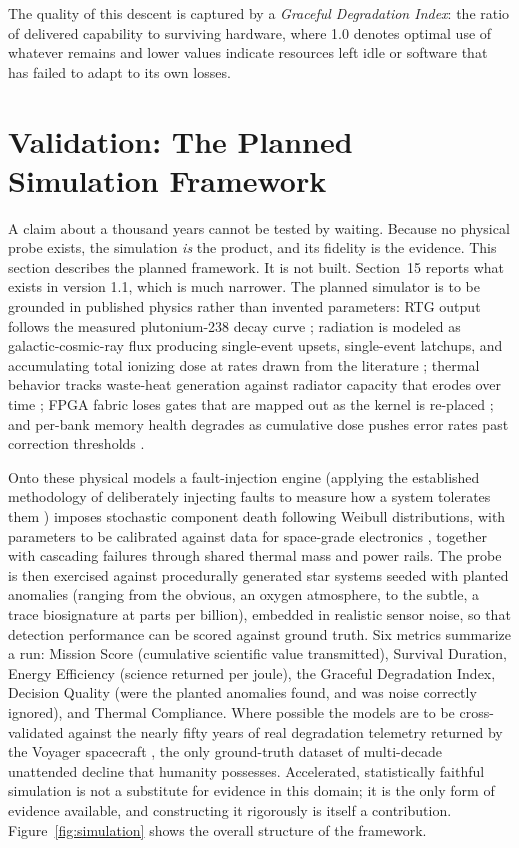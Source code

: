 \documentclass[10pt, a4paper]{article}
\begin{document}
The quality of this descent is captured by a \textit{Graceful Degradation Index}: the ratio of delivered capability to surviving hardware, where 1.0 denotes optimal use of whatever remains and lower values indicate resources left idle or software that has failed to adapt to its own losses.

\section{Validation: The Planned Simulation Framework}

A claim about a thousand years cannot be tested by waiting. Because no physical probe exists, the simulation \textit{is} the product, and its fidelity is the evidence. This section describes the planned framework. It is not built. Section~15 reports what exists in version 1.1, which is much narrower. The planned simulator is to be grounded in published physics rather than invented parameters: RTG output follows the measured plutonium-238 decay curve \cite{bennett2006}; radiation is modeled as galactic-cosmic-ray flux producing single-event upsets, single-event latchups, and accumulating total ionizing dose at rates drawn from the literature \cite{normand1996, baumann2005, schwank2008}; thermal behavior tracks waste-heat generation against radiator capacity that erodes over time \cite{gilmore2002}; FPGA fabric loses gates that are mapped out as the kernel is re-placed \cite{wirthlin2015}; and per-bank memory health degrades as cumulative dose pushes error rates past correction thresholds \cite{gerardin2010}.

Onto these physical models a fault-injection engine (applying the established methodology of deliberately injecting faults to measure how a system tolerates them \cite{hsueh1997}) imposes stochastic component death following Weibull distributions, with parameters to be calibrated against data for space-grade electronics \cite{weibull1951}, together with cascading failures through shared thermal mass and power rails. The probe is then exercised against procedurally generated star systems seeded with planted anomalies (ranging from the obvious, an oxygen atmosphere, to the subtle, a trace biosignature at parts per billion), embedded in realistic sensor noise, so that detection performance can be scored against ground truth. Six metrics summarize a run: Mission Score (cumulative scientific value transmitted), Survival Duration, Energy Efficiency (science returned per joule), the Graceful Degradation Index, Decision Quality (were the planted anomalies found, and was noise correctly ignored), and Thermal Compliance. Where possible the models are to be cross-validated against the nearly fifty years of real degradation telemetry returned by the Voyager spacecraft \cite{kohlhase1977}, the only ground-truth dataset of multi-decade unattended decline that humanity possesses. Accelerated, statistically faithful simulation is not a substitute for evidence in this domain; it is the only form of evidence available, and constructing it rigorously is itself a contribution. Figure~\ref{fig:simulation} shows the overall structure of the framework.
\end{document}

